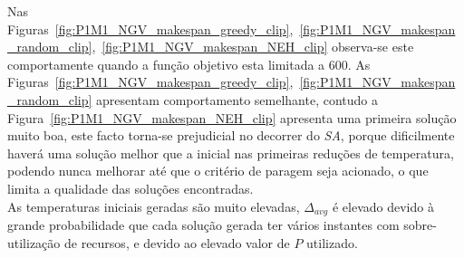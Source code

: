 Nas Figuras~\ref{fig:P1M1_NGV_makespan_greedy_clip},~\ref{fig:P1M1_NGV_makespan_random_clip},~\ref{fig:P1M1_NGV_makespan_NEH_clip} observa-se este comportamente quando a função objetivo esta limitada a 600. As Figuras~\ref{fig:P1M1_NGV_makespan_greedy_clip},~\ref{fig:P1M1_NGV_makespan_random_clip} apresentam comportamento semelhante, contudo a Figura~\ref{fig:P1M1_NGV_makespan_NEH_clip} apresenta uma primeira solução muito boa, este facto torna-se prejudicial no decorrer do \textit{SA}, porque dificilmente haverá uma solução melhor que a inicial nas primeiras reduções de temperatura, podendo nunca melhorar até que o critério de paragem seja acionado, o que limita a qualidade das soluções encontradas.\\

As temperaturas iniciais geradas são muito elevadas, $\Delta_{avg}$ é elevado devido à grande probabilidade que cada solução gerada ter vários instantes com sobre-utilização de recursos, e devido ao elevado valor de $P$ utilizado.\\
